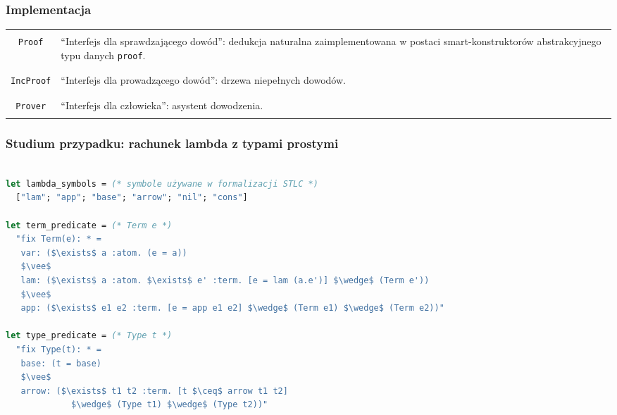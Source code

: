\documentclass[aspectratio=169]{beamer}
\renewcommand{\tt}[1]{\texttt{\small{#1}}}
\begin{document}
\begin{frame}
\frametitle{Implementacja}
  \begin{tabularx}{\linewidth}{|c|X|}
    \hline & \\
    \tt{Proof}
      & ``Interfejs dla sprawdzającego dowód'':
          dedukcja naturalna zaimplementowana w postaci smart-konstruktorów
          abstrakcyjnego typu danych \tt{proof}. \\ & \\
    \hline & \\
    \tt{IncProof}
      & ``Interfejs dla prowadzącego dowód'':
          drzewa niepełnych dowodów. \\ & \\
    \hline & \\
    \tt{Prover}
      & ``Interfejs dla człowieka'':
          asystent dowodzenia. \\ & \\
    \hline
  \end{tabularx}
\end{frame}


\begin{frame}[fragile]
\frametitle{Studium przypadku: rachunek lambda z typami prostymi}
\begin{lstlisting}[mathescape,language=OCaml,escapebegin=\color{codepurple}]

let lambda_symbols = (* symbole używane w formalizacji STLC *)
  ["lam"; "app"; "base"; "arrow"; "nil"; "cons"]

let term_predicate = (* Term e *)
  "fix Term(e): * =
   var: ($\exists$ a :atom. (e = a))
   $\vee$
   lam: ($\exists$ a :atom. $\exists$ e' :term. [e = lam (a.e')] $\wedge$ (Term e'))
   $\vee$
   app: ($\exists$ e1 e2 :term. [e = app e1 e2] $\wedge$ (Term e1) $\wedge$ (Term e2))"

let type_predicate = (* Type t *)
  "fix Type(t): * =
   base: (t = base)
   $\vee$
   arrow: ($\exists$ t1 t2 :term. [t $\ceq$ arrow t1 t2]
             $\wedge$ (Type t1) $\wedge$ (Type t2))"
\end{lstlisting}
\end{frame}
\end{document}
